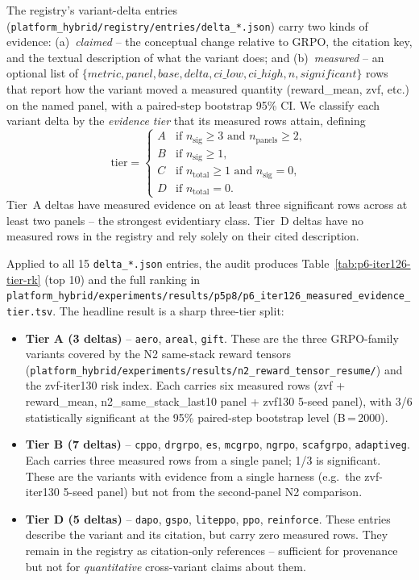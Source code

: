 \documentclass{article}
\begin{document}
The registry's variant-delta entries
(\texttt{platform_hybrid/registry/entries/delta\_*.json}) carry two kinds of evidence:
(a)~\emph{claimed} -- the conceptual change relative to GRPO, the citation
key, and the textual description of what the variant does; and
(b)~\emph{measured} -- an optional list of $\{metric, panel, base, delta,
ci\_low, ci\_high, n, significant\}$ rows that report how the variant moved
a measured quantity (reward\_mean, zvf, etc.) on the named panel, with a
paired-step bootstrap 95\% CI.  We classify each variant delta by the
\emph{evidence tier} that its measured rows attain, defining
\[
\text{tier} = \begin{cases}
A & \text{if } n_{\text{sig}} \geq 3 \text{ and } n_{\text{panels}} \geq 2,\\
B & \text{if } n_{\text{sig}} \geq 1,\\
C & \text{if } n_{\text{total}} \geq 1 \text{ and } n_{\text{sig}} = 0,\\
D & \text{if } n_{\text{total}} = 0.
\end{cases}
\]
Tier~A deltas have measured evidence on at least three significant rows
across at least two panels -- the strongest evidentiary class.
Tier~D deltas have no measured rows in the registry and rely solely on
their cited description.

Applied to all 15 \texttt{delta\_*.json} entries, the audit produces
Table~\ref{tab:p6-iter126-tier-rk} (top 10) and the full ranking in
\texttt{platform_hybrid/experiments/results/p5p8/p6\_iter126\_measured\_evidence\_tier.tsv}.
The headline result is a sharp three-tier split:
\begin{itemize}
\item \textbf{Tier A (3 deltas)} -- \texttt{aero}, \texttt{areal}, \texttt{gift}.
These are the three GRPO-family variants covered by the N2
same-stack reward tensors
(\texttt{platform_hybrid/experiments/results/n2\_reward\_tensor\_resume/}) and the
zvf-iter130 risk index.  Each carries six measured rows (zvf +
reward\_mean, n2\_same\_stack\_last10 panel + zvf130 5-seed panel), with
3/6 statistically significant at the 95\% paired-step bootstrap level
(B\,=\,2000).
\item \textbf{Tier B (7 deltas)} -- \texttt{cppo}, \texttt{drgrpo}, \texttt{es},
\texttt{mcgrpo}, \texttt{ngrpo}, \texttt{scafgrpo}, \texttt{adaptiveg}.
Each carries three measured rows from a single panel; 1/3 is significant.
These are the variants with evidence from a single harness
(e.g.\ the zvf-iter130 5-seed panel) but not from the second-panel N2
comparison.
\item \textbf{Tier D (5 deltas)} -- \texttt{dapo}, \texttt{gspo}, \texttt{liteppo},
\texttt{ppo}, \texttt{reinforce}.  These entries describe the variant and
its citation, but carry zero measured rows.  They remain in the registry
as citation-only references -- sufficient for provenance but not for
\emph{quantitative} cross-variant claims about them.
\end{itemize}
\end{document}
